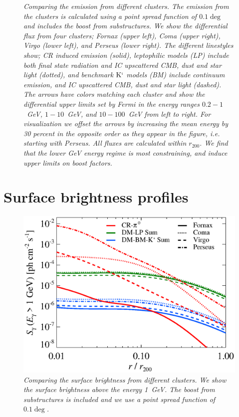 \documentclass[10pt,aps,pra,reprint,amsmath,amsfonts,amssymb,showpacs]{revtex4-1}
\newcommand{\rmn}{\mathrm}
\newcommand{\rvir}{r_{200}}
\newcommand{\Km}{\rmn{K}`}
\begin{document}
\begin{figure}
\begin{minipage}{2.0\columnwidth}
\caption{\it Comparing the emission from different clusters. The
  emission from the clusters is calculated using a point spread
  function of $0.1\deg$ and includes the boost from substructures. We
  show the differential flux from four clusters; Fornax (upper left),
  Coma (upper right), Virgo (lower left), and Perseus (lower
  right). The different linestyles show; CR induced emission (solid),
  leptophilic models (LP) include both final state radiation and IC
  upscattered CMB, dust and star light (dotted), and benchmark $\Km$
  models (BM) include continuum emission, and IC upscattered CMB, dust
  and star light (dashed). The arrows have colors matching each
  cluster and show the differential upper limits set by Fermi in the
  energy ranges $0.2-1$~GeV, $1-10$~GeV, and $10-100$~GeV from left to
  right. For visualization we offset the arrows by increasing the mean
  energy by 30 percent in the opposite order as they appear in the
  figure, i.e. starting with Perseus. All fluxes are calculated within
  $\rvir$. We find that the lower GeV energy regime is most
  constraining, and induce upper limits on boost factors.}
 \label{fig9}
\end{minipage}
\end{figure}


\section{Surface brightness profiles}

\begin{figure}
 \includegraphics[width=0.99\columnwidth]{figures/SB.v9.1GeV.SF300.SubMass.elmu.eps}
\caption{\it Comparing the surface brightness from different
  clusters. We show the surface brightness above the energy 1~GeV. The
  boost from substructures is included and we use a point spread
  function of $0.1\deg$.}
 \label{fig20}
\end{figure}
\end{document}
